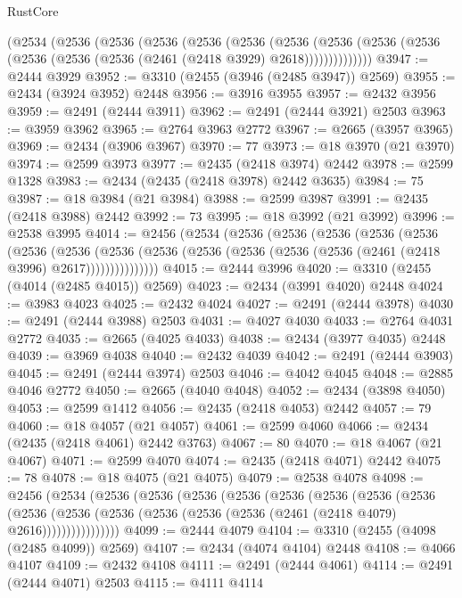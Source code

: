 \begin{lexlean}{RustCore}
\begin{coremodule}
    (@2534
      (@2536
        (@2536
          (@2536
            (@2536
              (@2536
                (@2536
                  (@2536 (@2536 (@2536 (@2536 (@2536 (@2536 (@2461 (@2418 @3929) @2618))))))))))))))
@3947 := @2444 @3929
@3952 := @3310 (@2455 (@3946 (@2485 @3947)) @2569)
@3955 := @2434 (@3924 @3952) @2448
@3956 := @3916 @3955
@3957 := @2432 @3956
@3959 := @2491 (@2444 @3911)
@3962 := @2491 (@2444 @3921) @2503
@3963 := @3959 @3962
@3965 := @2764 @3963 @2772
@3967 := @2665 (@3957 @3965)
@3969 := @2434 (@3906 @3967)
@3970 := 77
@3973 := @18 @3970 (@21 @3970)
@3974 := @2599 @3973
@3977 := @2435 (@2418 @3974) @2442
@3978 := @2599 @1328
@3983 := @2434 (@2435 (@2418 @3978) @2442 @3635)
@3984 := 75
@3987 := @18 @3984 (@21 @3984)
@3988 := @2599 @3987
@3991 := @2435 (@2418 @3988) @2442
@3992 := 73
@3995 := @18 @3992 (@21 @3992)
@3996 := @2538 @3995
@4014 := @2456
    (@2534
      (@2536
        (@2536
          (@2536
            (@2536
              (@2536
                (@2536
                  (@2536
                    (@2536
                      (@2536 (@2536 (@2536 (@2536 (@2536 (@2461 (@2418 @3996) @2617)))))))))))))))
@4015 := @2444 @3996
@4020 := @3310 (@2455 (@4014 (@2485 @4015)) @2569)
@4023 := @2434 (@3991 @4020) @2448
@4024 := @3983 @4023
@4025 := @2432 @4024
@4027 := @2491 (@2444 @3978)
@4030 := @2491 (@2444 @3988) @2503
@4031 := @4027 @4030
@4033 := @2764 @4031 @2772
@4035 := @2665 (@4025 @4033)
@4038 := @2434 (@3977 @4035) @2448
@4039 := @3969 @4038
@4040 := @2432 @4039
@4042 := @2491 (@2444 @3903)
@4045 := @2491 (@2444 @3974) @2503
@4046 := @4042 @4045
@4048 := @2885 @4046 @2772
@4050 := @2665 (@4040 @4048)
@4052 := @2434 (@3898 @4050)
@4053 := @2599 @1412
@4056 := @2435 (@2418 @4053) @2442
@4057 := 79
@4060 := @18 @4057 (@21 @4057)
@4061 := @2599 @4060
@4066 := @2434 (@2435 (@2418 @4061) @2442 @3763)
@4067 := 80
@4070 := @18 @4067 (@21 @4067)
@4071 := @2599 @4070
@4074 := @2435 (@2418 @4071) @2442
@4075 := 78
@4078 := @18 @4075 (@21 @4075)
@4079 := @2538 @4078
@4098 := @2456
    (@2534
      (@2536
        (@2536
          (@2536
            (@2536
              (@2536
                (@2536
                  (@2536
                    (@2536
                      (@2536
                        (@2536
                          (@2536 (@2536 (@2536 (@2536 (@2461 (@2418 @4079) @2616))))))))))))))))
@4099 := @2444 @4079
@4104 := @3310 (@2455 (@4098 (@2485 @4099)) @2569)
@4107 := @2434 (@4074 @4104) @2448
@4108 := @4066 @4107
@4109 := @2432 @4108
@4111 := @2491 (@2444 @4061)
@4114 := @2491 (@2444 @4071) @2503
@4115 := @4111 @4114

\end{coremodule}
\end{lexlean}
